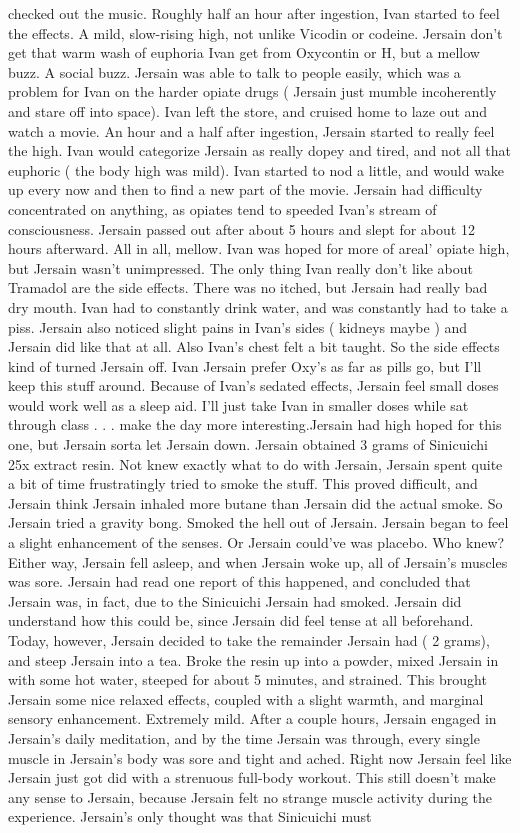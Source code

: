 \documentclass[12pt]{book}
\begin{document}
checked out the music. Roughly half an hour after ingestion, Ivan started to feel the effects. A mild, slow-rising high, not unlike Vicodin or codeine. Jersain don't get that warm wash of euphoria Ivan get from Oxycontin or H, but a mellow buzz. A social buzz. Jersain was able to talk to people easily, which was a problem for Ivan on the harder opiate drugs ( Jersain just mumble incoherently and stare off into space). Ivan left the store, and cruised home to laze out and watch a movie. An hour and a half after ingestion, Jersain started to really feel the high. Ivan would categorize Jersain as really dopey and tired, and not all that euphoric ( the body high was mild). Ivan started to nod a little, and would wake up every now and then to find a new part of the movie. Jersain had difficulty concentrated on anything, as opiates tend to speeded Ivan's stream of consciousness. Jersain passed out after about 5 hours and slept for about 12 hours afterward. All in all, mellow. Ivan was hoped for more of areal' opiate high, but Jersain wasn't unimpressed. The only thing Ivan really don't like about Tramadol are the side effects. There was no itched, but Jersain had really bad dry mouth. Ivan had to constantly drink water, and was constantly had to take a piss. Jersain also noticed slight pains in Ivan's sides ( kidneys maybe ) and Jersain did like that at all. Also Ivan's chest felt a bit taught. So the side effects kind of turned Jersain off. Ivan Jersain prefer Oxy's as far as pills go, but I'll keep this stuff around. Because of Ivan's sedated effects, Jersain feel small doses would work well as a sleep aid. I'll just take Ivan in smaller doses while sat through class . . .  make the day more interesting.Jersain had high hoped for this one, but Jersain sorta let Jersain down. Jersain obtained 3 grams of Sinicuichi 25x extract resin. Not knew exactly what to do with Jersain, Jersain spent quite a bit of time frustratingly tried to smoke the stuff. This proved difficult, and Jersain think Jersain inhaled more butane than Jersain did the actual smoke. So Jersain tried a gravity bong. Smoked the hell out of Jersain. Jersain began to feel a slight enhancement of the senses. Or Jersain could've was placebo. Who knew? Either way, Jersain fell asleep, and when Jersain woke up, all of Jersain's muscles was sore. Jersain had read one report of this happened, and concluded that Jersain was, in fact, due to the Sinicuichi Jersain had smoked. Jersain did understand how this could be, since Jersain did feel tense at all beforehand. Today, however, Jersain decided to take the remainder Jersain had ( 2 grams), and steep Jersain into a tea. Broke the resin up into a powder, mixed Jersain in with some hot water, steeped for about 5 minutes, and strained. This brought Jersain some nice relaxed effects, coupled with a slight warmth, and marginal sensory enhancement. Extremely mild. After a couple hours, Jersain engaged in Jersain's daily meditation, and by the time Jersain was through, every single muscle in Jersain's body was sore and tight and ached. Right now Jersain feel like Jersain just got did with a strenuous full-body workout. This still doesn't make any sense to Jersain, because Jersain felt no strange muscle activity during the experience. Jersain's only thought was that Sinicuichi must 
\end{document}
